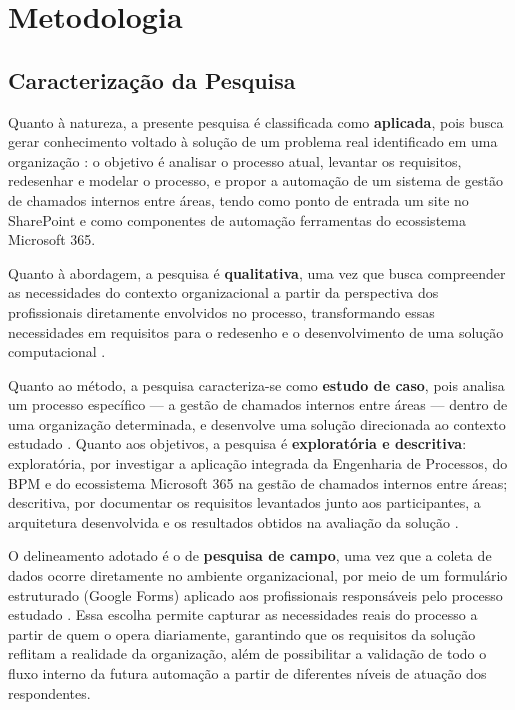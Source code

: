 \section{Metodologia}

\subsection{Caracterização da Pesquisa}

Quanto à natureza, a presente pesquisa é classificada como
\textbf{aplicada}, pois busca gerar conhecimento voltado à
solução de um problema real identificado em uma organização
\cite{Gil2002}: o objetivo é analisar o processo atual,
levantar os requisitos, redesenhar e modelar o processo, e
propor a automação de um sistema de gestão de chamados
internos entre áreas, tendo como ponto de entrada um site no
SharePoint e como componentes de automação ferramentas do
ecossistema Microsoft 365.

Quanto à abordagem, a pesquisa é \textbf{qualitativa}, uma
vez que busca compreender as necessidades do contexto
organizacional a partir da perspectiva dos profissionais
diretamente envolvidos no processo, transformando essas
necessidades em requisitos para o redesenho e o
desenvolvimento de uma solução computacional \cite{Gil2002}.

Quanto ao método, a pesquisa caracteriza-se como
\textbf{estudo de caso}, pois analisa um processo específico
--- a gestão de chamados internos entre áreas --- dentro de
uma organização determinada, e desenvolve uma solução
direcionada ao contexto estudado \cite{Gil2002}. Quanto aos
objetivos, a pesquisa é \textbf{exploratória e descritiva}:
exploratória, por investigar a aplicação integrada da
Engenharia de Processos, do BPM e do ecossistema Microsoft
365 na gestão de chamados internos entre áreas; descritiva,
por documentar os requisitos levantados junto aos
participantes, a arquitetura desenvolvida e os resultados
obtidos na avaliação da solução \cite{Santos2023}.

O delineamento adotado é o de \textbf{pesquisa de campo}, uma
vez que a coleta de dados ocorre diretamente no ambiente
organizacional, por meio de um formulário estruturado (Google
Forms) aplicado aos profissionais responsáveis pelo processo
estudado \cite{Gil2002}. Essa escolha permite capturar as
necessidades reais do processo a partir de quem o opera
diariamente, garantindo que os requisitos da solução reflitam
a realidade da organização, além de possibilitar a validação
de todo o fluxo interno da futura automação a partir de
diferentes níveis de atuação dos respondentes.

